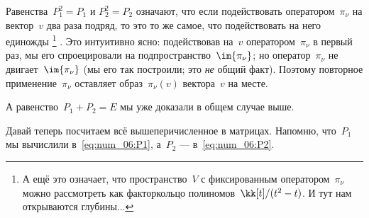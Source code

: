 \begin{solution}
	Равенства~$P_1^2 = P_1$ и $P_2^2 = P_2$ означают, что если подействовать оператором~$\pi_\nu$ на вектор~$v$ два раза подряд, то это то же самое, что подействовать на него единожды%
	\footnote{%
		А ещё это означает, что пространство~$V$ с фиксированным оператором~$\pi_\nu$ можно рассмотреть как факторкольцо полиномов~$\kk[t]/(t^2 - t)$. И тут нам открываются глубины...
	}%
	. Это интуитивно ясно: подействовав на~$v$ оператором~$\pi_\nu$ в первый раз, мы его спроецировали на подпространство~$\im{\pi_\nu}$; но оператор~$\pi_\nu$ не двигает~$\im{\pi_\nu}$ (мы его так построили; это \emph{не} общий факт). Поэтому повторное применение~$\pi_\nu$ оставляет образ~$\pi_\nu(v)$ вектора~$v$ на месте.

	А равенство~$P_1 + P_2 = E$ мы уже доказали в общем случае выше.

	Давай теперь посчитаем всё вышеперичисленное в матрицах. Напомню, что~$P_1$ мы вычислили в~\eqref{eq:num_06:P1}, а~$P_2$ --- в~\eqref{eq:num_06:P2}.


\end{solution}
